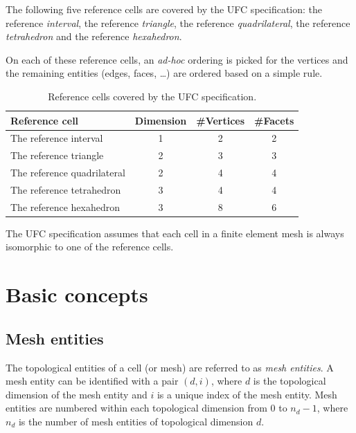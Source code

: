 The following five reference cells are covered by the UFC specification:
the reference \emph{interval},
the reference \emph{triangle},
the reference \emph{quadrilateral},
the reference \emph{tetrahedron} and
the reference \emph{hexahedron}.

On each of these reference cells, an \emph{ad-hoc} ordering is picked
for the vertices and the remaining entities (edges, faces, \ldots) are
ordered based on a simple rule.

\begin{table}[H]
  \begin{center}
    \begin{tabular}{|l|c|c|c|}
      \hline
      Reference cell & Dimension & \#Vertices & \#Facets \\
      \hline
      \hline
      The reference interval      & 1 & 2 & 2 \\
      \hline
      The reference triangle      & 2 & 3 & 3 \\
      \hline
      The reference quadrilateral & 2 & 4 & 4 \\
      \hline
      The reference tetrahedron   & 3 & 4 & 4 \\
      \hline
      The reference hexahedron    & 3 & 8 & 6 \\
      \hline
    \end{tabular}
    \caption{Reference cells covered by the UFC specification.}
  \end{center}
\end{table}

The UFC specification assumes that each cell in a finite element mesh
is always isomorphic to one of the reference cells.

\section{Basic concepts}

\subsection{Mesh entities}

The topological entities of a cell (or mesh) are referred to as
\emph{mesh entities}. A mesh entity can be identified with a pair
$(d, i)$, where $d$ is the topological dimension of the mesh entity and $i$
is a unique index of the mesh entity. Mesh entities are numbered
within each topological dimension from $0$ to $n_d-1$, where $n_d$ is
the number of mesh entities of topological dimension $d$.

